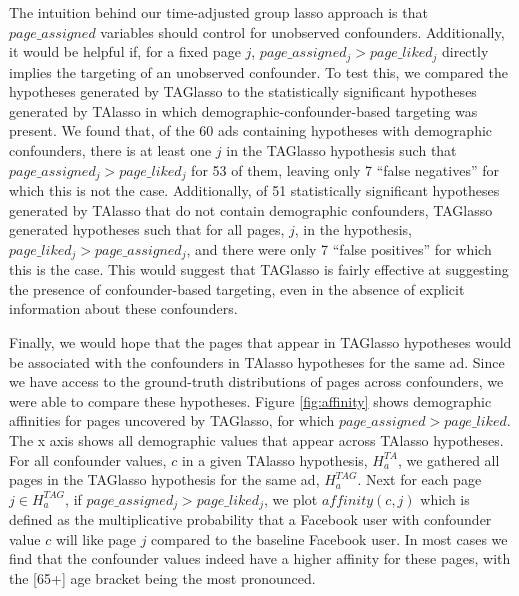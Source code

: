 \documentclass[]{article}
\begin{document}
The intuition behind our time-adjusted group lasso approach is that
\(page\_assigned\) variables should control for unobserved confounders.
Additionally, it would be helpful if, for a fixed page \(j\),
\(page\_assigned_j > page\_liked_j\) directly implies the targeting of
an unobserved confounder. To test this, we compared the hypotheses
generated by TAGlasso to the statistically significant hypotheses
generated by TAlasso in which demographic-confounder-based targeting was
present. We found that, of the 60 ads containing hypotheses with
demographic confounders, there is at least one \(j\) in the TAGlasso
hypothesis such that \(page\_assigned_j > page\_liked_j\) for 53 of
them, leaving only 7 ``false negatives'' for which this is not the case.
Additionally, of 51 statistically significant hypotheses generated by
TAlasso that do not contain demographic confounders, TAGlasso generated
hypotheses such that for all pages, \(j\), in the hypothesis,
\(page\_liked_j > page\_assigned_j\), and there were only 7 ``false
positives'' for which this is the case. This would suggest that TAGlasso
is fairly effective at suggesting the presence of confounder-based
targeting, even in the absence of explicit information about these
confounders.

Finally, we would hope that the pages that appear in TAGlasso hypotheses
would be associated with the confounders in TAlasso hypotheses for the
same ad. Since we have access to the ground-truth distributions of pages
across confounders, we were able to compare these hypotheses. Figure
\ref{fig:affinity} shows demographic affinities for pages uncovered by
TAGlasso, for which \(page\_assigned > page\_liked\). The x axis shows
all demographic values that appear across TAlasso hypotheses. For all
confounder values, \(c\) in a given TAlasso hypothesis, \(H_a^{TA}\), we
gathered all pages in the TAGlasso hypothesis for the same ad,
\(H_a^{TAG}\). Next for each page \(j \in H_a^{TAG}\), if
\(page\_assigned_j > page\_liked_j\), we plot \(affinity(c,j)\) which is
defined as the multiplicative probability that a Facebook user with
confounder value \(c\) will like page \(j\) compared to the baseline
Facebook user. In most cases we find that the confounder values indeed
have a higher affinity for these pages, with the {[}65+{]} age bracket
being the most pronounced.
\end{document}
